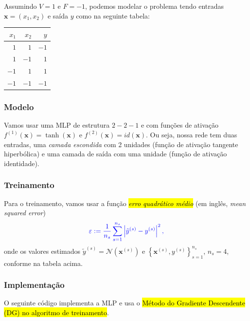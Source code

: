 Assumindo $V = 1$ e $F = -1$, podemos modelar o problema tendo entradas $\pmb{x} = (x_1, x_2)$ e saída $y$ como na seguinte tabela:

\begin{center}
  \begin{tabular}{rr|r}
    $x_1$ & $x_2$ & $y$ \\\hline
    $1$ & $1$ & $-1$ \\
    $1$ & $-1$ & $1$ \\
    $-1$ & $1$ & $1$ \\
    $-1$ & $-1$ & $-1$ \\\hline
  \end{tabular}
\end{center}

\subsubsection{Modelo}

Vamos usar uma MLP de estrutura $2-2-1$ e com funções de ativação $f^{(1)}(\pmb{x}) = \tanh(\pmb{x})$ e $f^{(2)}(\pmb{x}) = id(\pmb{x})$. Ou seja, nossa rede tem duas entradas, uma \emph{camada escondida} com 2 unidades (função de ativação tangente hiperbólica) e uma camada de saída com uma unidade (função de ativação identidade).

\subsubsection{Treinamento}

Para o treinamento, vamos usar a função \hl{\emph{erro quadrático médio}} (em inglês, \textit{mean squared error})
\begin{equation}\color{blue}\varepsilon := \frac{1}{n_s}\sum_{s=1}^{n_s}\left|\tilde{y}^{(s)} - y^{(s)}\right|^2,
\end{equation}
onde os valores estimados $\tilde{y}^{(s)} = \mathcal{N}\left(\pmb{x}^{(s)}\right)$ e $\left\{\pmb{x}^{(s)}, y^{(s)}\right\}_{s=1}^{n_s}$, $n_s=4$, conforme na tabela acima.

\subsubsection{Implementação}

O seguinte código implementa a MLP e usa o \hl{Método do Gradiente Descendente (DG) no algoritmo de treinamento}.


